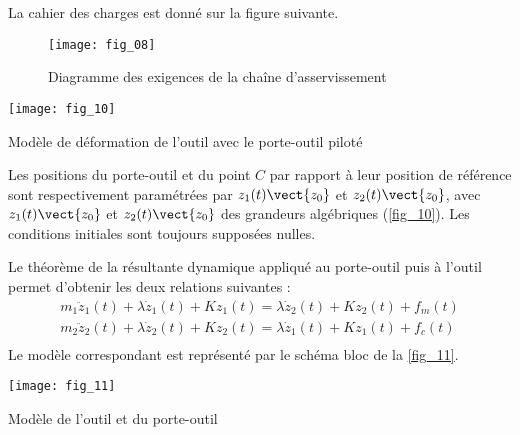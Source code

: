 La cahier des charges est donné sur la figure suivante.

\begin{figure}[H]
\centering
\texttt{[image: fig\_08]}
\caption{Diagramme des exigences de la chaîne d'asservissement \label{fig_08}}
\end{figure}


\begin{marginfigure}[-3cm]
\centering
\texttt{[image: fig\_10]}
\caption{Modèle de déformation de l'outil avec le porte-outil piloté \label{fig_10}}
\end{marginfigure}

Les positions du porte-outil et du point $C$  par rapport à leur position de référence sont respectivement paramétrées
par $z_1(t)\vect{z_0}$ et $z_2(t)\vect{z_0}$, avec $z_1(t)\vect{z_0}$ et $z_2(t)\vect{z_0}$ des grandeurs algébriques (\autoref{fig_10}). Les conditions initiales
sont toujours supposées nulles.


Le théorème de la résultante dynamique appliqué au porte-outil puis à l’outil permet d’obtenir les deux relations
suivantes :
$$
\begin{array}{l}
m_1\ddot{z}_1(t)+\lambda\dot{z}_1(t)+Kz_1(t) = \lambda\dot{z}_2(t)+Kz_2(t)+f_m(t) \\
m_2\ddot{z}_2(t)+\lambda\dot{z}_2(t)+Kz_2(t) = \lambda\dot{z}_1(t)+Kz_1(t)+f_c(t) \\
\end{array} $$
Le modèle correspondant est représenté par le schéma bloc de la  \autoref{fig_11}.

\begin{marginfigure}
\centering
\texttt{[image: fig\_11]}
\caption{Modèle de l'outil et du porte-outil \label{fig_11}}
\end{marginfigure}

\fi

